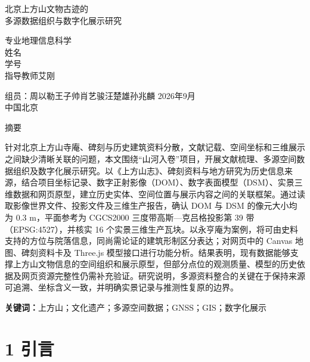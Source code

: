 \documentclass[UTF8,a4paper,zihao=-4]{ctexart}
\begin{document}
\begin{titlepage}
\centering
\vspace*{2.5cm}
{\heiti{}北京上方山文物古迹的\\[0.3em]多源数据组织与数字化展示研究\par}
\vspace{2cm}
{
专业\quad 地理信息科学\\[0.8em]
姓名\quad \underline{\hspace{4cm}}\\[0.8em]
学号\quad \underline{\hspace{4cm}}\\[0.8em]
指导教师\quad 艾刚\par}
\vspace{1cm}
组员：周以勒\quad 王子帅\quad 肖艺骏\quad 汪楚雄\quad 孙兆麟
\vfill
2026年9月\\中国\quad 北京
\end{titlepage}
\begin{center}{\heiti{}摘\quad 要}\end{center}


针对北京上方山寺庵、碑刻与历史建筑资料分散，文献记载、空间坐标和三维展示之间缺少清晰关联的问题，本文围绕“山河入卷”项目，开展文献梳理、多源空间数据组织及数字化展示研究。以《上方山志》、碑刻资料与地方研究为历史信息来源，结合项目坐标记录、数字正射影像（DOM）、数字表面模型（DSM）、实景三维数据和网页原型，建立历史实体、空间位置与展示内容之间的关联框架。通过读取影像世界文件、投影文件及三维生产报告，确认 DOM 与 DSM 的像元大小均为 0.3 m，平面参考为 CGCS2000 三度带高斯—克吕格投影第 39 带（EPSG:4527），并核实 16 个实景三维生产瓦块。以永亨庵为案例，将可由史料支持的方位与院落信息，同尚需论证的建筑形制区分表达；对网页中的 Canvas 地图、碑刻资料卡及 Three.js 模型接口进行功能分析。结果表明，现有数据能够支撑上方山文物信息的空间组织和展示原型，但部分点位的观测质量、模型的历史依据及网页资源完整性仍需补充验证。研究说明，多源资料整合的关键在于保持来源可追溯、坐标含义一致，并明确实景记录与推测性复原的边界。



\noindent\textbf{关键词：}上方山；文化遗产；多源空间数据；GNSS；GIS；数字化展示


\clearpage
\tableofcontents
\clearpage
{}


\section*{1 引言}
\end{document}
